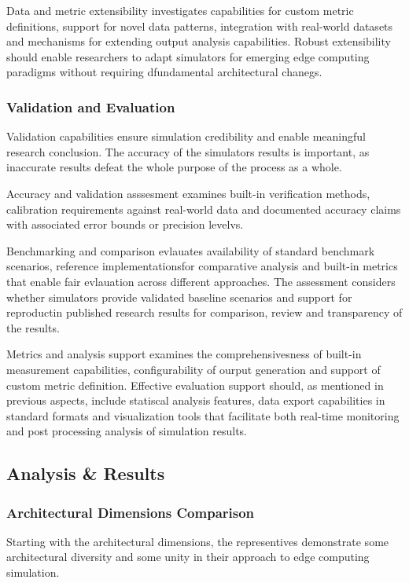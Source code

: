 Data and metric extensibility investigates capabilities for custom metric definitions, support for novel data patterns, integration with real-world datasets and mechanisms for extending output analysis capabilities.
Robust extensibility should enable researchers to adapt simulators for emerging edge computing paradigms without requiring dfundamental architectural chanegs.

\subsubsection{Validation and Evaluation}
Validation capabilities ensure simulation credibility and enable meaningful research conclusion.
The accuracy of the simulators results is important, as inaccurate results defeat the whole purpose of the process as a whole.

Accuracy and validation asssesment examines built-in verification methods, calibration requirements against real-world data and documented accuracy claims with associated error bounds or precision levelvs.

Benchmarking and comparison evlauates availability of standard benchmark scenarios, reference implementationsfor comparative analysis and built-in metrics that enable fair evlauation across different approaches.
The assessment considers whether simulators provide validated baseline scenarios and support for reproductin published research results for comparison, review and transparency of the results.

Metrics and analysis support examines the comprehensivesness of built-in measurement capabilities, configurability of ourput generation and support of custom metric definition.
Effective evaluation support should, as mentioned in previous aspects, include statiscal analysis features, data export capabilities in standard formats and visualization tools that facilitate both real-time monitoring and post processing analysis of simulation results. 

\newpage
\subsection{Analysis \& Results}

\subsubsection{Architectural Dimensions Comparison}
Starting with the architectural dimensions, the representives demonstrate some architectural diversity and some unity in their approach to edge computing simulation.

